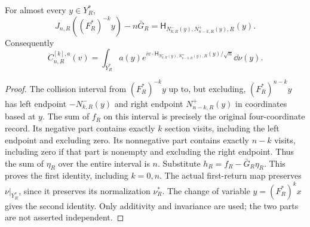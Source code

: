 \begin{lemma}
\label{lem:marked-compensation}
For almost every $y\in Y_R^*$,
\begin{equation}\label{eq:marked-compensation}
 J_{n,R}((F_R^*)^{-k}y)-n\bar G_R
   =\mathsf H_{N^-_{k,R}(y),N^+_{n-k,R}(y),R}(y).
\end{equation}
Consequently
\begin{equation}\label{eq:marked-recentering}
 C^{[k],a}_{n,R}(v)=\int_{Y_R^*}a(y)
 e^{iv\cdot\mathsf H_{N^-_{k,R}(y),N^+_{n-k,R}(y),R}(y)/\sqrt n}
 \dd\nu(y).
\end{equation}
\end{lemma}
\begin{proof}
The collision interval from $(F_R^*)^{-k}y$ up to, but excluding,
$(F_R^*)^{n-k}y$ has left endpoint $-N^-_{k,R}(y)$ and right endpoint
$N^+_{n-k,R}(y)$ in coordinates based at $y$. The sum of $f_R$ on this
interval is precisely the original four-coordinate record. Its negative
part contains exactly $k$ section visits, including the left endpoint
and excluding zero. Its nonnegative part contains exactly $n-k$ visits,
including zero if that part is nonempty and excluding the right endpoint.
Thus the sum of $\eta_R$ over the entire interval is $n$. Substitute
$h_R=f_R-\bar G_R\eta_R$. This proves the first identity, including
$k=0,n$. The actual first-return map preserves $\nu|_{Y_R^*}$, since it
preserves its normalization $\nu_R^*$. The change of variable
$y=(F_R^*)^kx$ gives the second identity. Only additivity and invariance
are used; the two parts are not asserted independent.
\end{proof}

